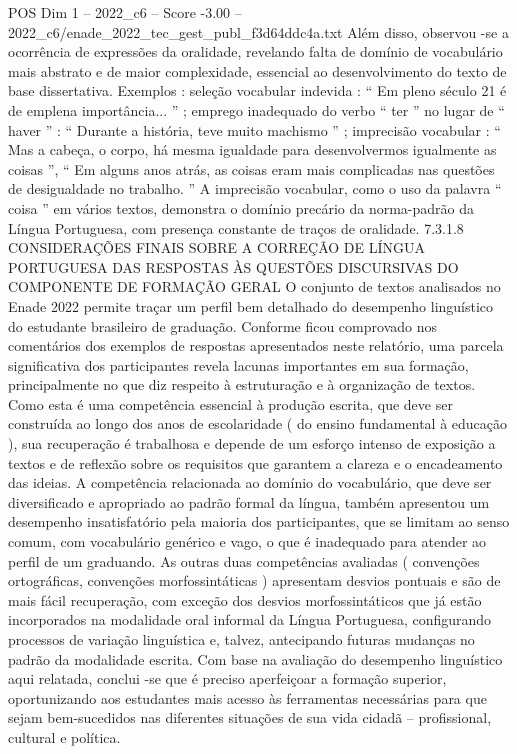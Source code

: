 \begin{textsample}{POS Dim 1 – 2022\_c6 – Score -3.00 – 2022\_c6/enade\_2022\_tec\_gest\_publ\_f3d64ddc4a.txt}
Além disso, observou -se a ocorrência de expressões da oralidade, revelando falta de domínio de vocabulário mais abstrato e de maior complexidade, essencial ao desenvolvimento do texto de base dissertativa.
Exemplos : seleção vocabular indevida : “ Em pleno século 21 é de emplena importância... ” ; emprego inadequado do verbo “ ter ” no lugar de “ haver ” : “ Durante a história, teve muito machismo ” ; imprecisão vocabular : “ Mas a cabeça, o corpo, há mesma igualdade para desenvolvermos igualmente as coisas ”, “ Em alguns anos atrás, as coisas eram mais complicadas nas questões de desigualdade no trabalho. ” A imprecisão vocabular, como o uso da palavra “ coisa ” em vários textos, demonstra o domínio precário da norma-padrão da Língua Portuguesa, com presença constante de traços de oralidade. 7.3.1.8 CONSIDERAÇÕES FINAIS SOBRE A CORREÇÃO DE LÍNGUA PORTUGUESA DAS RESPOSTAS ÀS QUESTÕES DISCURSIVAS DO COMPONENTE DE FORMAÇÃO GERAL O conjunto de textos analisados no Enade 2022 permite traçar um perfil bem detalhado do desempenho linguístico do estudante brasileiro de graduação.
Conforme ficou comprovado nos comentários dos exemplos de respostas apresentados neste relatório, uma parcela significativa dos participantes revela lacunas importantes em sua formação, principalmente no que diz respeito à estruturação e à organização de textos.
Como esta é uma competência essencial à produção escrita, que deve ser construída ao longo dos anos de escolaridade ( do ensino fundamental à educação ), sua recuperação é trabalhosa e depende de um esforço intenso de exposição a textos e de reflexão sobre os requisitos que garantem a clareza e o encadeamento das ideias.
A competência relacionada ao domínio do vocabulário, que deve ser diversificado e apropriado ao padrão formal da língua, também apresentou um desempenho insatisfatório pela maioria dos participantes, que se limitam ao senso comum, com vocabulário genérico e vago, o que é inadequado para atender ao perfil de um graduando.
As outras duas competências avaliadas ( convenções ortográficas, convenções morfossintáticas ) apresentam desvios pontuais e são de mais fácil recuperação, com exceção dos desvios morfossintáticos que já estão incorporados na modalidade oral informal da Língua Portuguesa, configurando processos de variação linguística e, talvez, antecipando futuras mudanças no padrão da modalidade escrita.
Com base na avaliação do desempenho linguístico aqui relatada, conclui -se que é preciso aperfeiçoar a formação superior, oportunizando aos estudantes mais acesso às ferramentas necessárias para que sejam bem-sucedidos nas diferentes situações de sua vida cidadã – profissional, cultural e política.

\end{textsample}
